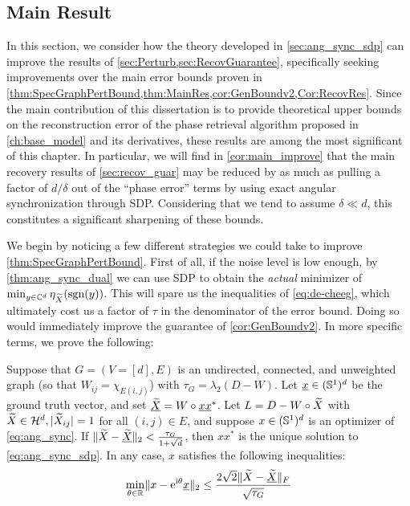 \subsection{Main Result}
In this section, we consider how the theory developed in \cref{sec:ang_sync_sdp} can improve the results of \cref{sec:Perturb,sec:RecovGuarantee}, specifically seeking improvements over the main error bounds proven in \cref{thm:SpecGraphPertBound,thm:MainRes,cor:GenBoundv2,Cor:RecovRes}.  Since the main contribution of this dissertation is to provide theoretical upper bounds on the reconstruction error of the phase retrieval algorithm proposed in \cref{ch:base_model} and its derivatives, these results are among the most significant of this chapter.  In particular, we will find in \cref{cor:main_improve} that the main recovery results of \cref{sec:recov_guar} may be reduced by as much as pulling a factor of $d / \delta$ out of the ``phase error'' terms by using exact angular synchronization through SDP.  Considering that we tend to assume $\delta \ll d$, this constitutes a significant sharpening of these bounds.

We begin by noticing a few different strategies we could take to improve \cref{thm:SpecGraphPertBound}.  First of all, if the noise level is low enough, by \cref{thm:ang_sync_dual} we can use SDP to obtain the \emph{actual} minimizer of $\min_{y \in \mathbb{C}^d} \eta_{\widetilde{X}}(\operatorname{sgn}(y))$.  This will spare us the inequalities of \eqref{eq:de-cheeg}, which ultimately cost us a factor of $\tau$ in the denominator of the error bound.  Doing so would immediately improve the guarantee of \cref{cor:GenBoundv2}.  In more specific terms, we prove the following:

\begin{theorem}
  Suppose that $G = (V=[d], E)$ is an undirected, connected, and unweighted graph (so that $W_{ij} = \chi_{E(i, j)}$) with $\tau_G = \lambda_2(D - W)$.  Let $\underline{x} \in (\mathbb{S}^1)^d$ be the ground truth vector, and set $\underline{\widetilde{X}} = W \circ \underline{x} \underline{x}^*$.  Let $L = D - W \circ \widetilde{X}$ with $\widetilde{X} \in \mathcal{H}^d, |\widetilde{X}_{ij}| = 1$ for all $(i, j) \in E$, and suppose $x \in (\mathbb{S}^1)^d$ is an optimizer of \eqref{eq:ang_sync}.  If $\lVert \widetilde{X} - \underline{\widetilde{X}} \rVert_2 < \frac{\tau_G}{1 + \sqrt{d}}$, then $x x^*$ is the unique solution to \eqref{eq:ang_sync_sdp}.  In any case, $x$ satisfies the following inequalities:
  \begin{equation}
    \min_{\theta \in \mathbb{R}} \lVert x - \mathrm{e}^{\mathrm{i} \theta} \underline{x} \rVert_2 \le
    \dfrac{2 \sqrt{2} \lVert \widetilde{X} - \underline{\widetilde{X}} \rVert_F}{\sqrt{\tau_G}} \label{eq:ISP2}
  \end{equation}
  \label{thm:improved_spec_pert}
\end{theorem}

